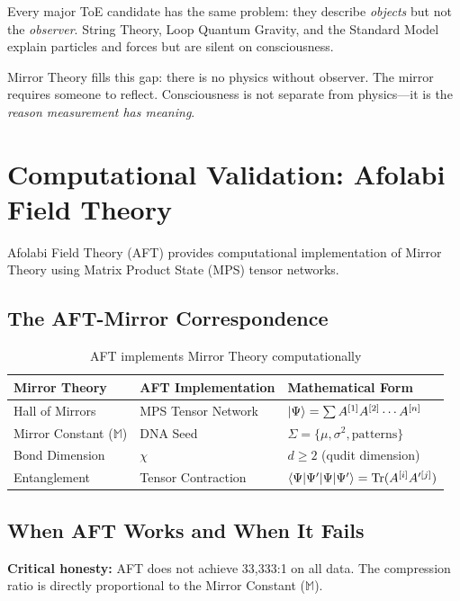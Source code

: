 \documentclass[12pt,a4paper]{article}
\begin{document}
Every major ToE candidate has the same problem: they describe \textit{objects} but not the \textit{observer}. String Theory, Loop Quantum Gravity, and the Standard Model explain particles and forces but are silent on consciousness.

Mirror Theory fills this gap: there is no physics without observer. The mirror requires someone to reflect. Consciousness is not separate from physics---it is the \textit{reason measurement has meaning}.

\section{Computational Validation: Afolabi Field Theory}

Afolabi Field Theory (AFT) provides computational implementation of Mirror Theory using Matrix Product State (MPS) tensor networks.

\subsection{The AFT-Mirror Correspondence}

\begin{table}[h]
\centering
\begin{tabular}{lll}
\toprule
\textbf{Mirror Theory} & \textbf{AFT Implementation} & \textbf{Mathematical Form} \\
\midrule
Hall of Mirrors & MPS Tensor Network & $\ket{\Psi} = \sum A^{[1]} A^{[2]} \cdots A^{[n]}$ \\
Mirror Constant ($\mathbb{M}$) & DNA Seed & $\Sigma = \{\mu, \sigma^2, \text{patterns}\}$ \\
Bond Dimension & $\chi$ & $d \geq 2$ (qudit dimension) \\
Entanglement & Tensor Contraction & $\braket{\Psi|\Psi'} = \text{Tr}(A^{[i]} A'^{[j]})$ \\
\bottomrule
\end{tabular}
\caption{AFT implements Mirror Theory computationally}
\end{table}

\subsection{When AFT Works and When It Fails}

\textbf{Critical honesty:} AFT does not achieve 33,333:1 on all data. The compression ratio is directly proportional to the Mirror Constant ($\mathbb{M}$).
\end{document}
